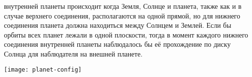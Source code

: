 \begin{minipage}{0.36\tw}
	 внутренней планеты происходит когда Земля, Солнце и планета, также как и в случае верхнего соединения, располагаются на одной прямой, но для нижнего соединения планета должна находиться между Солнцем и Землей. Если бы орбиты всех планет лежали в одной плоскости, тогда в момент каждого нижнего соединения внутренней планеты наблюдалось бы её прохождение по диску Солнца для наблюдателя на внешней планете.
\end{minipage}
\begin{minipage}{0.63\tw}
	\centering
	\vspace{-1pc}
	\texttt{[image: planet-config]}

\end{minipage}
